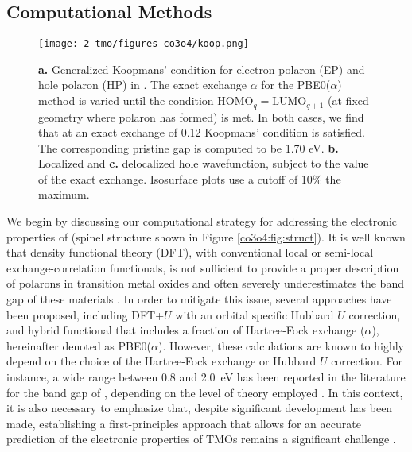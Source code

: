\subsection{Computational Methods}

\begin{figure}[t]
\begin{center}
\texttt{[image: 2-tmo/figures-co3o4/koop.png]}
\caption{\textbf{a.} Generalized Koopmans' condition for electron polaron (EP) and hole polaron (HP) in \co. The exact exchange $\alpha$ for the PBE0($\alpha$) method is varied until the condition $\text{HOMO}_q=\text{LUMO}_{q+1}$ (at fixed geometry where polaron has formed) is met. In both cases, we find that at an exact exchange of 0.12 Koopmans' condition is satisfied. The corresponding pristine gap is computed to be 1.70 eV. \textbf{b.} Localized and \textbf{c.} delocalized hole wavefunction, subject to the value of the exact exchange. Isosurface plots use a cutoff of 10\% the maximum.}
\label{co3o4:fig:IPEA}
\end{center}
\end{figure}

We begin by discussing our computational strategy for addressing the electronic properties of \co{} (spinel structure shown in Figure \ref{co3o4:fig:struct}). It is well known that density functional theory (DFT), with conventional local or semi-local exchange-correlation functionals, is not sufficient to provide a proper description of polarons in transition metal oxides and often severely underestimates the band gap of these materials \cite{dudarev1998electron}. In order to mitigate this issue, several approaches have been proposed, including DFT+$U$ with an orbital specific Hubbard $U$ correction, and hybrid functional that includes a fraction of Hartree-Fock exchange ($\alpha$), hereinafter denoted as PBE0($\alpha$). However, these calculations are known to highly depend on the choice of the Hartree-Fock exchange or Hubbard $U$ correction. For instance, a wide range between 0.8 and 2.0~eV has been reported in the literature for the band gap of \co, depending on the level of theory employed \cite{singh2014}. In this context, it is also necessary to emphasize that, despite significant development has been made, establishing a first-principles approach that allows for an accurate prediction of the electronic properties of TMOs remains a significant challenge \cite{kent2018toward}.


